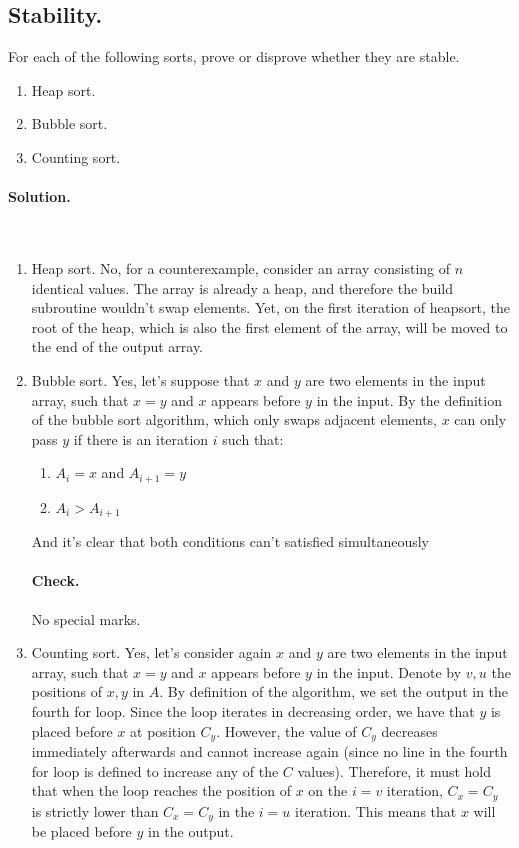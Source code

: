 \fi


 \subsection{Stability.} For each of the following sorts, prove or disprove whether they are stable.
 \begin{enumerate}
   \item Heap sort. 
   \item Bubble sort.
   \item Counting sort.
 \end{enumerate}

\ifdefined\SOLUTION
  \paragraph{Solution.} \\
\begin{enumerate}
  \item Heap sort. No, for a counterexample, consider an array consisting of $n$ identical values. The array is already a heap, and therefore the build subroutine wouldn't swap elements. Yet, on the first iteration of heapsort, the root of the heap, which is also the first element of the array, will be moved to the end of the output array.
  \item Bubble sort. Yes, let's suppose that $x$ and $y$ are two elements in the input array, such that $x = y$ and $x$ appears before $y$ in the input. By the definition of the bubble sort algorithm, which only swaps adjacent elements, $x$ can only pass $y$ if there is an iteration $i$ such that: \begin{enumerate}
      \item $A_{i}=x$ and $A_{i+1}=y$
      \item $A_{i} > A_{i+1}$ 
    \end{enumerate} And it's clear that both conditions can't satisfied simultaneously
\ifdefined\CHECK
  \paragraph{Check.} No special marks.
\fi
  \item Counting sort. Yes, let's consider again $x$ and $y$ are two elements in the input array, such that $x = y$ and $x$ appears before $y$ in the input. Denote by $v,u$ the positions of $x,y$ in $A$. By definition of the algorithm, we set the output in the fourth for loop. Since the loop iterates in decreasing order, we have that $y$ is placed before $x$ at position $C_{y}$. However, the value of $C_{y}$ decreases immediately afterwards and cannot increase again (since no line in the fourth for loop is defined to increase any of the $C$ values). Therefore, it must hold that when the loop reaches the position of $x$ on the $i = v$ iteration, $C_{x}=C_{y}$ is strictly lower than $C_{x}=C_{y}$ in the $i=u$ iteration. This means that $x$ will be placed before $y$ in the output.
 \end{enumerate}
\fi

